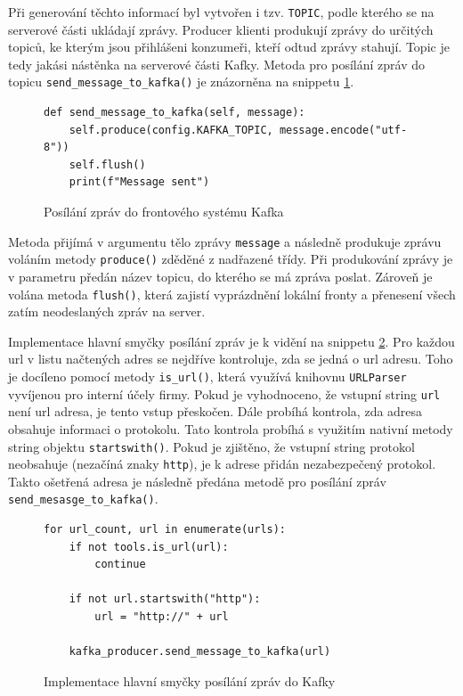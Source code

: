 \documentclass[thesis=M,czech,hidelinks]{FITthesis}[2013/05/06]
\begin{document}
Při generování těchto informací byl vytvořen i tzv. \texttt{TOPIC}, podle kterého se na serverové části ukládají zprávy. Producer klienti produkují zprávy do určitých topiců, ke kterým jsou přihlášeni konzumeři, kteří odtud zprávy stahují. Topic je tedy jakási nástěnka na serverové části Kafky. Metoda pro posílání zpráv do topicu \texttt{send_message_to_kafka()} je znázorněna na snippetu \ref{snip:kafkasend}.
\begin{figure}[h]               
	\begin{verbatim}
def send_message_to_kafka(self, message):
    self.produce(config.KAFKA_TOPIC, message.encode("utf-8"))
    self.flush()
    print(f"Message sent")
	\end{verbatim}      
	\caption{Posílání zpráv do frontového systému Kafka}
	\label{snip:kafkasend}
\end{figure}
Metoda přijímá v argumentu tělo zprávy \texttt{message} a následně produkuje zprávu voláním metody \texttt{produce()} zděděné z nadřazené třídy. Při produkování zprávy je v parametru předán název topicu, do kterého se má zpráva poslat. Zároveň je volána metoda \texttt{flush()}, která zajistí vyprázdnění lokální fronty a přenesení všech zatím neodeslaných zpráv na server.

Implementace hlavní smyčky posílání zpráv je k vidění na snippetu \ref{snip:kafkasendmain}. Pro každou url v listu načtených adres se nejdříve kontroluje, zda se jedná o url adresu. Toho je docíleno pomocí metody \texttt{is_url()}, která využívá knihovnu \texttt{URLParser} vyvíjenou pro interní účely firmy. Pokud je vyhodnoceno, že vstupní string \texttt{url} není url adresa, je tento vstup přeskočen. Dále probíhá kontrola, zda adresa obsahuje informaci o protokolu. Tato kontrola probíhá s využitím nativní metody string objektu \texttt{startswith()}. Pokud je zjištěno, že vstupní string protokol neobsahuje (nezačíná znaky \texttt{http}), je k adrese přidán nezabezpečený protokol. Takto ošetřená adresa je následně předána metodě pro posílání zpráv \texttt{send_mesasge_to_kafka()}.
\begin{figure}[h]               
	\begin{verbatim}
for url_count, url in enumerate(urls):
    if not tools.is_url(url):
        continue

    if not url.startswith("http"):
        url = "http://" + url

    kafka_producer.send_message_to_kafka(url)
	\end{verbatim}      
	\caption{Implementace hlavní smyčky posílání zpráv do Kafky}
	\label{snip:kafkasendmain}
\end{figure}
\end{document}
